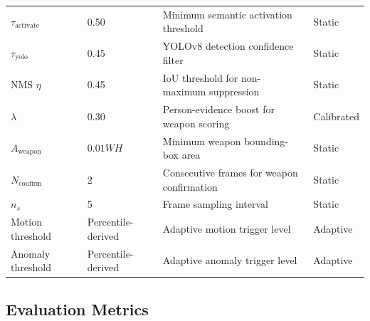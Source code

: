 \documentclass[a4paper,fleqn]{cas-dc}
\begin{document}
\begin{table}[!ht]
\begin{tabularx}{\linewidth}{p{1.85cm} p{1.15cm} >{\raggedright\arraybackslash}X p{1.35cm}}
$\tau_{\text{activate}}$            & 0.50          & Minimum semantic activation threshold         & Static \\
$\tau_{\text{yolo}}$                & 0.45          & YOLOv8 detection confidence filter            & Static \\
NMS $\eta$                          & 0.45          & IoU threshold for non-maximum suppression     & Static \\
$\lambda$                           & 0.30          & Person-evidence boost for weapon scoring      & Calibrated \\
$A_{\text{weapon}}$                 & $0.01 WH$     & Minimum weapon bounding-box area              & Static \\
$N_{\text{confirm}}$                & 2             & Consecutive frames for weapon confirmation    & Static \\
$n_s$                               & 5             & Frame sampling interval                       & Static \\
Motion threshold                    & Percentile-derived & Adaptive motion trigger level           & Adaptive \\
Anomaly threshold                   & Percentile-derived & Adaptive anomaly trigger level          & Adaptive \\
\bottomrule
\end{tabularx}
\end{table}
 
\FloatBarrier
\subsection{Evaluation Metrics}
\label{sec:metrics}
 
\end{document}
